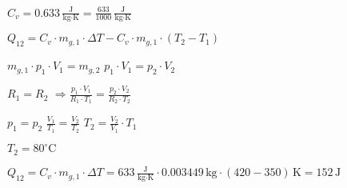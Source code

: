 \( C_v = 0.633 \, \frac{\text{J}}{\text{kg} \cdot \text{K}} = \frac{633}{1000} \, \frac{\text{J}}{\text{kg} \cdot \text{K}} \)  

\( Q_{12} = C_v \cdot m_{g,1} \cdot \Delta T - C_v \cdot m_{g,1} \cdot (T_2 - T_1) \)  

\( m_{g,1} \cdot p_1 \cdot V_1 = m_{g,2} \)  
\( p_1 \cdot V_1 = p_2 \cdot V_2 \)  

\( R_1 = R_2 \)  
\( \Rightarrow \frac{p_1 \cdot V_1}{R_1 \cdot T_1} = \frac{p_2 \cdot V_2}{R_2 \cdot T_2} \)  

\( p_1 = p_2 \)  
\( \frac{V_1}{T_1} = \frac{V_2}{T_2} \)  
\( T_2 = \frac{V_2}{V_1} \cdot T_1 \)  

\( T_2 = 80^\circ \text{C} \)  

\( Q_{12} = C_v \cdot m_{g,1} \cdot \Delta T = 633 \, \frac{\text{J}}{\text{kg} \cdot \text{K}} \cdot 0.003449 \, \text{kg} \cdot (420 - 350) \, \text{K} = 152 \, \text{J} \)